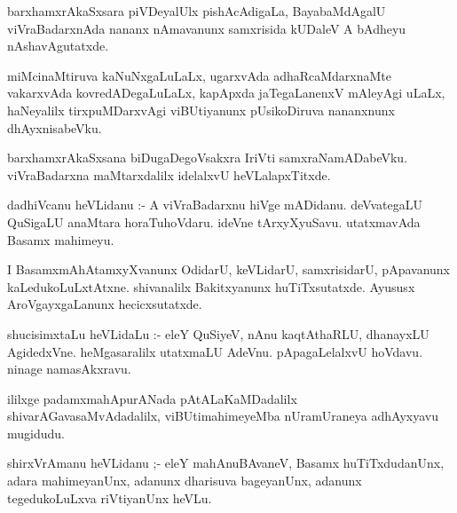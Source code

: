 \documentclass{article}
\begin{document}
\begin{mn}
barxhamxrAkaSxsara  piVDeyalUlx  pishAcAdigaLa,  BayabaMdAgalU  viVraBadarxnAda  nananx  nAmavanunx  samxrisida  
kUDaleV  A  bAdheyu  nAshavAgutatxde.
\end{mn}

\begin{mn}
miMcinaMtiruva  kaNuNxgaLuLaLx,  ugarxvAda  adhaRcaMdarxnaMte  vakarxvAda  kovredADegaLuLaLx,  kapApxda  
jaTegaLanenxV  mAleyAgi  uLaLx,  haNeyalilx  tirxpuMDarxvAgi  viBUtiyanunx  pUsikoDiruva  nananxnunx  dhAyxnisabeVku.
\end{mn}

\begin{mn}
barxhamxrAkaSxsana  biDugaDegoVsakxra  IriVti  samxraNamADabeVku.  viVraBadarxna  maMtarxdalilx  idelalxvU  heVLalapxTitxde.
\end{mn}

\begin{mn}
dadhiVcanu  heVLidanu :- A  viVraBadarxnu  hiVge  mADidanu. deVvategaLU  QuSigaLU  anaMtara  horaTuhoVdaru.  ideVne  
tArxyXyuSavu.  utatxmavAda  Basamx  mahimeyu.
\end{mn}

\begin{mn}
I  BasamxmAhAtamxyXvanunx  OdidarU,  keVLidarU,  samxrisidarU,  pApavanunx  kaLedukoLuLxtAtxne.  shivanalilx  Bakitxyanunx  
huTiTxsutatxde.  Ayususx  AroVgayxgaLanunx  hecicxsutatxde.
\end{mn}

\begin{mn}
shucisimxtaLu  heVLidaLu :- eleY  QuSiyeV,  nAnu  kaqtAthaRLU,  dhanayxLU  AgidedxVne.  heMgasaralilx  utatxmaLU  AdeVnu.  
pApagaLelalxvU  hoVdavu.  ninage  namasAkxravu.
\end{mn}

\begin{mn}
ililxge  padamxmahApurANada  pAtALaKaMDadalilx  shivarAGavasaMvAdadalilx,  viBUtimahimeyeMba  nUramUraneya  adhAyxyavu  mugidudu.
\end{mn}




\begin{mn}
shirxVrAmanu  heVLidanu ;- eleY  mahAnuBAvaneV,  Basamx  huTiTxdudanUnx,  adara  mahimeyanUnx,  
adanunx  dharisuva  bageyanUnx,  adanunx  tegedukoLuLxva  riVtiyanUnx  heVLu.

\end{mn}
\end{document}
